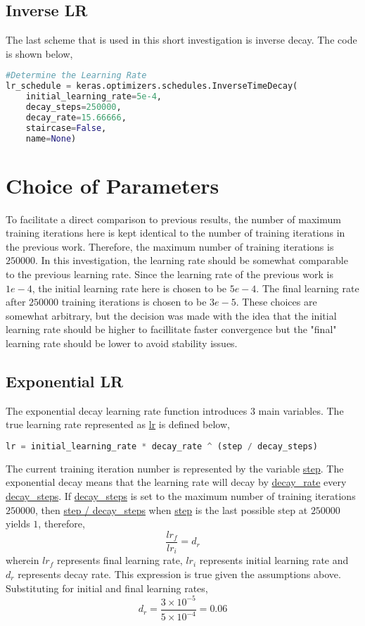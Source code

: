 \documentclass[a4paper, 12pt]{report}
\begin{document}
\begin{center}
\subsection{Inverse LR}
\begin{comment}
\end{comment}
The last scheme that is used in this short investigation is inverse decay. The code is shown below,
\begin{lstlisting}[language=python]
#Determine the Learning Rate
lr_schedule = keras.optimizers.schedules.InverseTimeDecay(
    initial_learning_rate=5e-4,
    decay_steps=250000,
    decay_rate=15.66666,
    staircase=False,
    name=None)
\end{lstlisting}

\section{Choice of Parameters}
\begin{comment}
\end{comment}
To facilitate a direct comparison to previous results, the number of maximum training iterations here is kept identical to the number of training iterations in the previous work. Therefore, the maximum number of training iterations is $250000$. In this investigation, the learning rate should be somewhat comparable to the previous learning rate. Since the learning rate of the previous work is $1e-4$, the initial learning rate here is chosen to be $5e-4$. The final learning rate after $250000$ training iterations is chosen to be $3e-5$. These choices are somewhat arbitrary, but the decision was made with the idea that the initial learning rate should be higher to facillitate faster convergence but the "final" learning rate should be lower to avoid stability issues.
\subsection{Exponential LR}
\begin{comment}
\end{comment}
The exponential decay learning rate function introduces $3$ main variables. The true learning rate represented as \url{lr} is defined below,
\begin{lstlisting}[language=python]
lr = initial_learning_rate * decay_rate ^ (step / decay_steps)
\end{lstlisting}
The current training iteration number is represented by the variable \url{step}. The exponential decay means that the learning rate will decay by \url{decay_rate} every \url{decay_steps}. If \url{decay_steps} is set to the maximum number of training iterations $250000$, then \url{step / decay_steps} when \url{step} is the last possible step at  $250000$ yields $1$, therefore,
$$\frac{lr_{f}}{lr_{i}} = d_{r}$$
wherein $lr_{f}$ represents final learning rate, $lr_{i}$ represents initial learning rate and $d_{r}$ represents decay rate. This expression is true given the assumptions above. Substituting for initial and final learning rates,
$$d_{r} = \frac{3\times10^{-5}}{5\times10^{-4}} = 0.06$$

\end{center}
\end{document}
